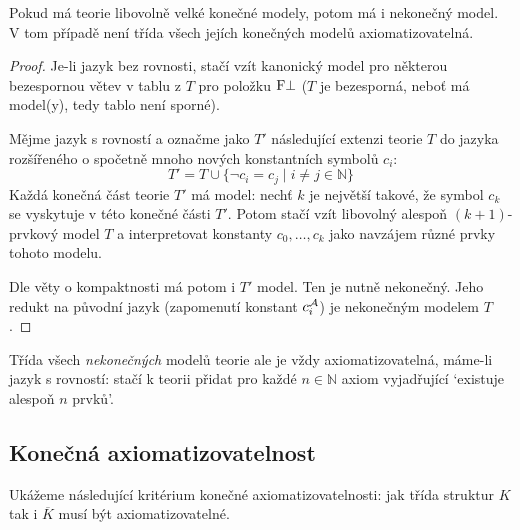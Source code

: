 \begin{theorem}
    Pokud má teorie libovolně velké konečné modely, potom má i nekonečný model. V tom případě není třída všech jejích konečných modelů axiomatizovatelná.
\end{theorem}
\begin{proof}
    Je-li jazyk bez rovnosti, stačí vzít kanonický model pro některou bezespornou větev v tablu z $T$ pro položku $\mathrm{F}\bot$ ($T$ je bezesporná, neboť má model(y), tedy tablo není sporné).

    Mějme jazyk s rovností a označme jako $T'$ následující extenzi teorie $T$ do jazyka rozšířeného o spočetně mnoho nových konstantních symbolů $c_i$:
    $$
    T'=T \cup \{\neg c_i = c_j \mid i\neq j\in\mathbb N\}
    $$
    Každá konečná část teorie $T'$ má model: nechť $k$ je největší takové, že symbol $c_k$ se vyskytuje v této konečné části $T'$. Potom stačí vzít libovolný alespoň $(k+1)$-prvkový model $T$ a interpretovat konstanty $c_0,\dots,c_k$ jako navzájem různé prvky tohoto modelu.

    Dle věty o kompaktnosti má potom i $T'$ model. Ten je nutně nekonečný. Jeho redukt na původní jazyk (zapomenutí konstant $c_i^{\mathcal{A}}$) je nekonečným modelem $T$.
\end{proof}

\begin{remark}
    Třída všech \emph{nekonečných} modelů teorie ale je vždy axiomatizovatelná, máme-li jazyk s rovností: stačí k teorii přidat pro každé $n\in\mathbb N$ axiom vyjadřující `existuje alespoň $n$ prvků'.
\end{remark}


\subsection{Konečná axiomatizovatelnost}

Ukážeme následující kritérium konečné axiomatizovatelnosti: jak třída struktur $K$ tak i $\overline{K}$ musí být axiomatizovatelné.

